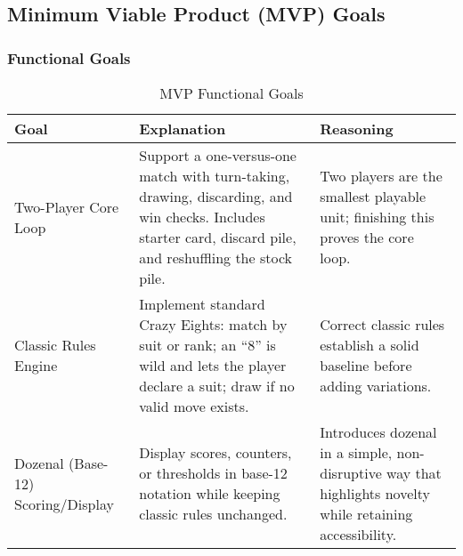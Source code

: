 \documentclass{article}
\begin{document}
    \subsection{Minimum Viable Product (MVP) Goals}

    \subsubsection{Functional Goals}
    \begin{table}[H]
        \caption{MVP Functional Goals}\label{TblMVPFunctionalGoals}
        \begin{tabular}{|p{}|p{}|p{}|}
            \hline
            \textbf{Goal} & \textbf{Explanation} & \textbf{Reasoning} \\
            \hline
            Two-Player Core Loop &
            Support a one-versus-one match with turn-taking, drawing, discarding, and win checks. Includes starter card, discard pile, and reshuffling the stock pile. &
            Two players are the smallest playable unit; finishing this proves the core loop. \\
            \hline
            Classic Rules Engine &
            Implement standard Crazy Eights: match by suit or rank; an ``8'' is wild and lets the player declare a suit; draw if no valid move exists. &
            Correct classic rules establish a solid baseline before adding variations. \\
            \hline
            Dozenal (Base-12) Scoring/Display &
            Display scores, counters, or thresholds in base-12 notation while keeping classic rules unchanged. &
            Introduces dozenal in a simple, non-disruptive way that highlights novelty while retaining accessibility. \\
            \hline
        \end{tabular}
    \end{table}
\end{document}
